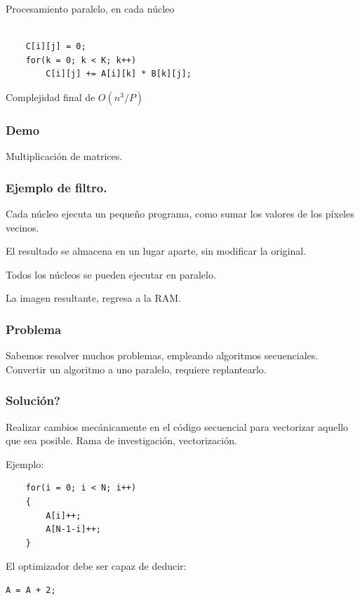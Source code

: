 \documentclass{beamer}
\begin{document}
\begin{frame}[fragile]
Procesamiento paralelo, en cada núcleo

\begin{lstlisting}

    C[i][j] = 0;
    for(k = 0; k < K; k++)
        C[i][j] += A[i][k] * B[k][j];

\end{lstlisting}

Complejidad final de $ O(n^3 / P) $

\end{frame}



\begin{frame}
\frametitle{Demo}
Multiplicación de matrices.
\end{frame}



\begin{frame}

\frametitle{Ejemplo de filtro.}

Cada núcleo ejecuta un pequeño programa, como sumar los valores
de los píxeles vecinos.

El resultado se almacena en un lugar aparte, sin modificar la original.

Todos los núcleos se pueden ejecutar en paralelo.

La imagen resultante, regresa a la RAM.

\end{frame}






\begin{frame}
\frametitle{Problema}

Sabemos resolver muchos problemas, empleando algoritmos secuenciales.
Convertir un algoritmo a uno paralelo, requiere replantearlo.

\end{frame}



\begin{frame}[fragile]
\frametitle{Solución?}

Realizar cambios mecánicamente en el código secuencial para vectorizar aquello
que sea posible. Rama de investigación, vectorización.

Ejemplo:

\begin{lstlisting}
    for(i = 0; i < N; i++)
    {
        A[i]++;
        A[N-1-i]++;
    }
\end{lstlisting}

El optimizador debe ser capaz de deducir:

\begin{lstlisting}
A = A + 2;
\end{lstlisting}

\end{frame}
\end{document}
